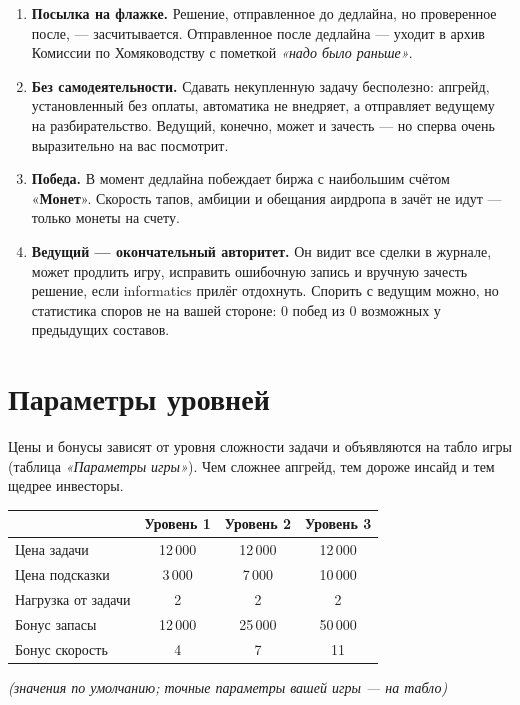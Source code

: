 \documentclass[12pt,a4paper]{article}
\newcommand{\term}[1]{«\textbf{#1}»}
\begin{document}
\begin{enumerate}[leftmargin=1.6em,itemsep=2pt]
\item \textbf{Посылка на флажке.} Решение, отправленное до дедлайна,
но проверенное после, --- засчитывается. Отправленное после дедлайна ---
уходит в архив Комиссии по Хомяководству с пометкой
\emph{«надо было раньше»}.

\item \textbf{Без самодеятельности.} Сдавать некупленную задачу
бесполезно: апгрейд, установленный без оплаты, автоматика не внедряет,
а отправляет ведущему на разбирательство. Ведущий, конечно, может
и зачесть --- но сперва очень выразительно на вас посмотрит.

\item \textbf{Победа.} В момент дедлайна побеждает биржа с наибольшим
счётом \term{Монет}. Скорость тапов, амбиции и обещания аирдропа
в зачёт не идут --- только монеты на счету.

\item \textbf{Ведущий --- окончательный авторитет.} Он видит все сделки
в журнале, может продлить игру, исправить ошибочную запись и вручную
зачесть решение, если informatics прилёг отдохнуть. Спорить с ведущим
можно, но статистика споров не на вашей стороне: 0 побед из 0 возможных
у предыдущих составов.

\end{enumerate}

\section*{Параметры уровней}

Цены и бонусы зависят от уровня сложности задачи и объявляются
на табло игры (таблица \emph{«Параметры игры»}). Чем сложнее апгрейд,
тем дороже инсайд и тем щедрее инвесторы.

\begin{center}
\begin{tabular}{lccc}
\toprule
 & \textbf{Уровень 1} & \textbf{Уровень 2} & \textbf{Уровень 3} \\
\midrule
Цена задачи        & 12\,000 & 12\,000 & 12\,000 \\
Цена подсказки     & 3\,000  & 7\,000  & 10\,000 \\
Нагрузка от задачи & 2       & 2       & 2       \\
Бонус запасы       & 12\,000 & 25\,000 & 50\,000 \\
Бонус скорость     & 4       & 7       & 11      \\
\bottomrule
\end{tabular}

\small\emph{(значения по умолчанию; точные параметры вашей игры --- на табло)}
\end{center}
\end{document}
